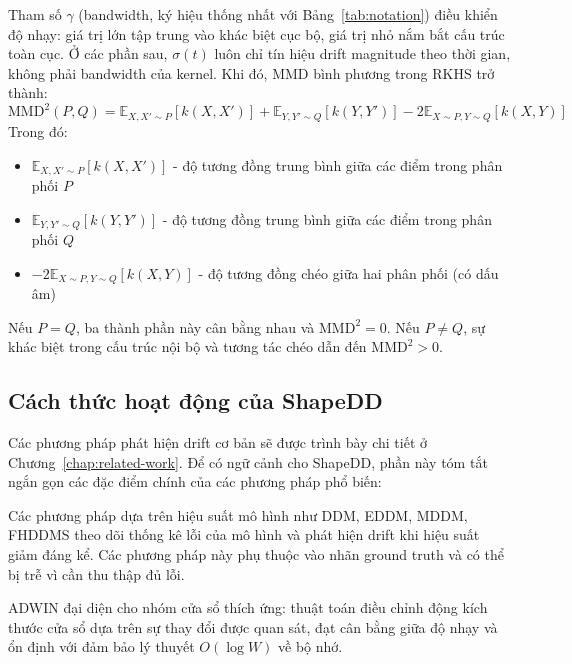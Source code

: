 Tham số $\gamma$ (bandwidth, ký hiệu thống nhất với Bảng~\ref{tab:notation}) điều khiển độ nhạy: giá trị lớn tập trung vào khác biệt cục bộ, giá trị nhỏ nắm bắt cấu trúc toàn cục. Ở các phần sau, $\sigma(t)$ luôn chỉ tín hiệu drift magnitude theo thời gian, không phải bandwidth của kernel.
Khi đó, MMD bình phương trong RKHS trở thành:
\begin{equation}
	\text{MMD}^2(P, Q) = \mathbb{E}_{X, X' \sim P}[k(X, X')] + \mathbb{E}_{Y, Y' \sim Q}[k(Y, Y')] - 2\mathbb{E}_{X \sim P, Y \sim Q}[k(X, Y)]
\end{equation}
Trong đó:
\begin{itemize}
	\item $\mathbb{E}_{X, X' \sim P}[k(X, X')]$ - độ tương đồng trung bình giữa các điểm trong phân phối $P$
	\item $\mathbb{E}_{Y, Y' \sim Q}[k(Y, Y')]$ - độ tương đồng trung bình giữa các điểm trong phân phối $Q$
	\item $-2\mathbb{E}_{X \sim P, Y \sim Q}[k(X, Y)]$ - độ tương đồng chéo giữa hai phân phối (có dấu âm)
\end{itemize}

Nếu $P = Q$, ba thành phần này cân bằng nhau và $\text{MMD}^2 = 0$. Nếu $P \neq Q$, sự khác biệt trong cấu trúc nội bộ và tương tác chéo dẫn đến $\text{MMD}^2 > 0$.

\subsection{Cách thức hoạt động của ShapeDD}

Các phương pháp phát hiện drift cơ bản sẽ được trình bày chi tiết ở Chương~\ref{chap:related-work}. Để có ngữ cảnh cho ShapeDD, phần này tóm tắt ngắn gọn các đặc điểm chính của các phương pháp phổ biến:

Các phương pháp dựa trên hiệu suất mô hình như DDM, EDDM, MDDM, FHDDMS theo dõi thống kê lỗi của mô hình và phát hiện drift khi hiệu suất giảm đáng kể. Các phương pháp này phụ thuộc vào nhãn ground truth và có thể bị trễ vì cần thu thập đủ lỗi.

ADWIN đại diện cho nhóm cửa sổ thích ứng: thuật toán điều chỉnh động kích thước cửa sổ dựa trên sự thay đổi được quan sát, đạt cân bằng giữa độ nhạy và ổn định với đảm bảo lý thuyết $O(\log W)$ về bộ nhớ.

